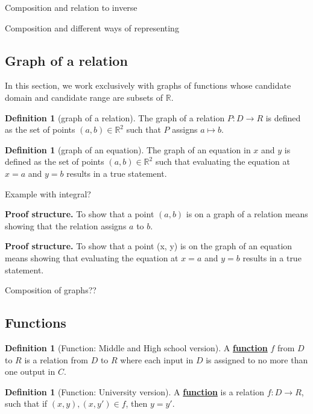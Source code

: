 \documentclass[11pt]{article}
\newcommand{\R}{\mathbb{R}}
\renewcommand\emph[1]{\underline{\bf{#1}}} %
\theoremstyle{definition}
\newtheorem{definition}[theorem]{Definition}
\begin{document}
Composition and relation to inverse

Composition and different ways of representing

\subsection{Graph of a relation}

In this section, we work exclusively with graphs of functions whose candidate domain and candidate range are subsets of $\R$. 
 
\begin{definition}[graph of a relation]\label{d: graph of a relation}
The graph of a relation $P:D\to R$ is defined as the set of points $(a, b)\in \R^2$ such that $P$ assigns $a\mapsto b$.
\end{definition}

\begin{definition}[graph of an equation]\label{d: graph of an equation}
The graph of an equation in $x$ and $y$ is defined as the set of points $(a, b) \in \R^2$ such that evaluating the equation at $x=a$ and $y=b$ results in a true statement.
\end{definition}

Example with integral?

{\bf Proof structure.}
To show that a point $(a, b)$ is on a graph of a relation means showing that the relation assigns $a$ to $b$.

{\bf Proof structure.}
To show that a point (x, y) is on the graph of an equation means showing that evaluating the equation at $x=a$ and $y=b$ results in a true statement.

Composition of graphs??

\subsection{Functions}


\begin{definition}[Function: Middle and High school version]\label{d: function middle high school}
A \emph{function} $f$ from $D$ to $R$ is a relation from $D$ to $R$ where each input in $D$ is assigned to no more than one output in $C$.
\end{definition} 
 
\begin{definition}[Function: University version]\label{d: function university} 
A \emph{function} is a relation $f: D \to R$, such that if $(x,y), (x, y')\in f$, then $y=y'$.
\end{definition}
\end{document}
